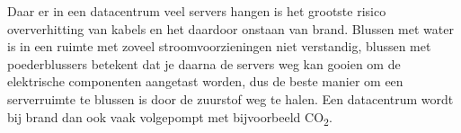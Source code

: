 Daar er in een datacentrum veel servers hangen is het grootste risico oververhitting van kabels en het daardoor onstaan van brand. Blussen met water is in een ruimte met zoveel stroomvoorzieningen niet verstandig, blussen met poederblussers betekent dat je daarna de servers weg kan gooien om de elektrische componenten aangetast worden, dus de beste manier om een serverruimte te blussen is door de zuurstof weg te halen. Een datacentrum wordt bij brand dan ook vaak volgepompt met bijvoorbeeld CO\textsubscript{2}.
